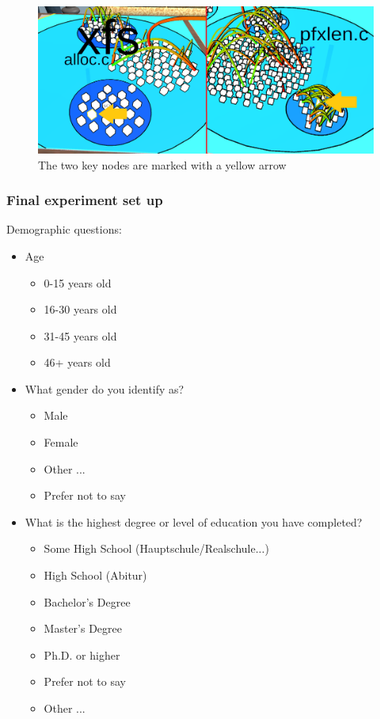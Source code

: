 \begin{figure}[htb]
  \centering
  \includegraphics[width=1\textwidth]{Evaluation/img/task1.png}
  \caption{The two key nodes are marked with a yellow arrow}\label{fig:task1}
\end{figure}

\subsubsection{Final experiment set up}
\label{final}
Demographic questions:
\begin{itemize}
  \item Age
        \begin{itemize}
          \item 0-15 years old
          \item 16-30 years old
          \item 31-45 years old
          \item 46+ years old
        \end{itemize}
  \item What gender do you identify as?
        \begin{itemize}
          \item Male
          \item Female
          \item Other ...
          \item Prefer not to say
        \end{itemize}
  \item What is the highest degree or level of education you have completed?
        \begin{itemize}
          \item Some High School (Hauptschule/Realschule...)
          \item High School (Abitur)
          \item Bachelor's Degree
          \item Master's Degree
          \item Ph.D. or higher
          \item Prefer not to say
          \item Other ...
        \end{itemize}
\end{itemize}

